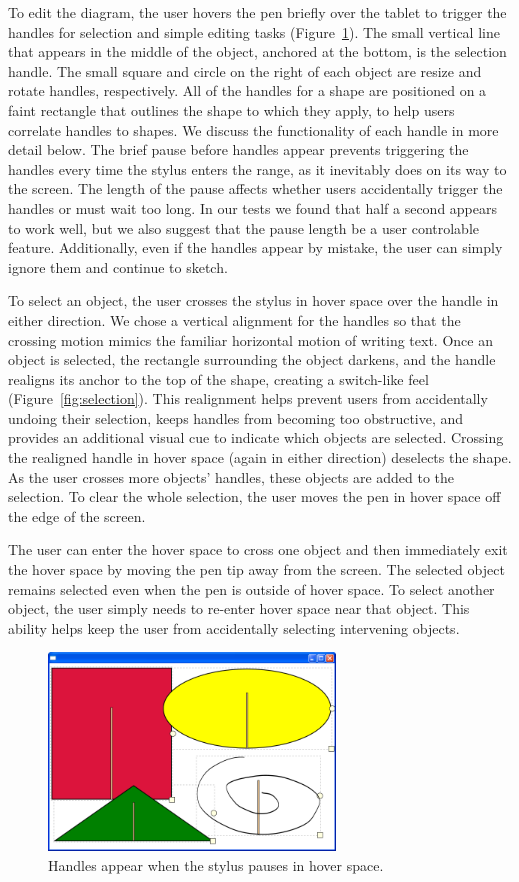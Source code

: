 \documentclass{article}
\begin{document}
To edit the diagram, the user hovers the pen briefly over the tablet
to trigger the handles for selection and simple editing tasks (Figure~\ref{fig:handles}).  The small
vertical line that appears in the middle of the object, anchored at the bottom, is the selection handle.  
The small square and circle on the right of each object are resize and rotate handles, respectively.  
All of the handles for a shape are positioned on a faint rectangle that outlines the
shape to which they apply, to help users correlate handles to shapes.  
We discuss the functionality of each handle in more detail below.  
The brief pause before handles appear prevents triggering the handles
every time the stylus enters the range, as it inevitably does on its
way to the screen.  The length of the pause affects whether 
users accidentally trigger the handles or must wait too long.  In our tests
we found that half a second appears to work well, but we also suggest that the 
pause length be a user controlable feature.  Additionally, even if the
handles appear by mistake, the user can simply ignore them and continue to sketch.

To select an object, the user crosses the stylus in hover space over the handle in either
direction.  We chose a vertical alignment for the handles so that the crossing motion mimics the 
familiar horizontal motion of writing text.  
Once an object is selected, the rectangle surrounding the object darkens, and the handle 
realigns its anchor to the top of the shape, creating a switch-like
feel (Figure~\ref{fig:selection}).  This realignment helps prevent users from 
accidentally undoing their selection, keeps
handles from becoming too obstructive, and provides an additional visual cue to indicate 
which objects are selected.  Crossing the realigned handle in hover space (again in either direction)
deselects the shape.  As the user crosses more objects' handles, these objects
are added to the selection.  To clear the whole selection, the user moves the pen in hover
space off the edge of the screen.

The user can enter the hover space to cross one object and then immediately exit the hover space by
moving the pen tip away from the screen.  The selected object remains
selected even when the pen is outside of hover space.  To select
another object, the user simply needs to re-enter hover space near
that object.  This ability helps keep the user from accidentally selecting intervening 
objects. 

\begin{figure}[tb]
\includegraphics[width=3.0in]{SelectionHandlesOn}
\caption{Handles appear when the stylus pauses in hover space.} 
\label{fig:handles}
\end{figure}
\end{document}
